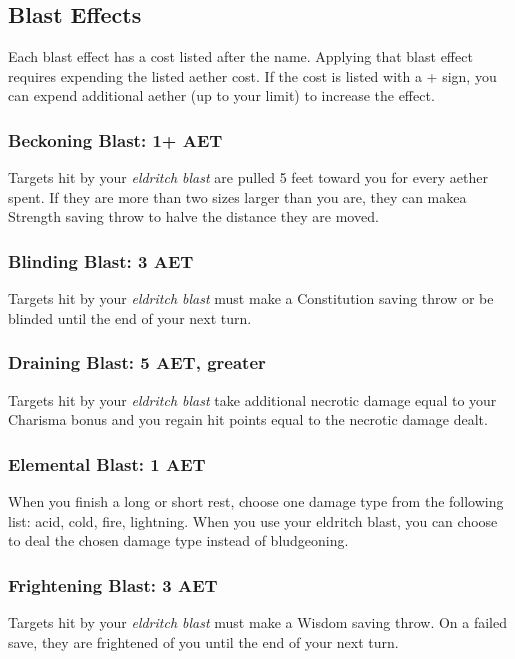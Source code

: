 \subsection{Blast Effects}

Each blast effect has a cost listed after the name. Applying that blast effect requires expending the listed aether cost. If the cost is listed with a + sign, you can expend additional aether (up to your limit) to increase the effect.

\subsubsection{Beckoning Blast: 1+ AET}
Targets hit by your \textit{eldritch blast} are pulled 5 feet toward you for every aether spent. If they are more than two sizes larger than you are, they can makea Strength saving throw to halve the distance they are moved.

\subsubsection{Blinding Blast: 3 AET}
Targets hit by your \textit{eldritch blast} must make a Constitution saving throw or be blinded until the end of your next turn.

\subsubsection{Draining Blast: 5 AET, greater}
Targets hit by your \textit{eldritch blast} take additional necrotic damage equal to your Charisma bonus and you regain hit points equal to the necrotic damage dealt.

\subsubsection{Elemental Blast: 1 AET}
When you finish a long or short rest, choose one damage type from the following list: acid, cold, fire, lightning. When you use your eldritch blast, you can choose to deal the chosen damage type instead of bludgeoning. 

\subsubsection{Frightening Blast: 3 AET}
Targets hit by your \textit{eldritch blast} must make a Wisdom saving throw. On a failed save, they are frightened of you until the end of your next turn.


